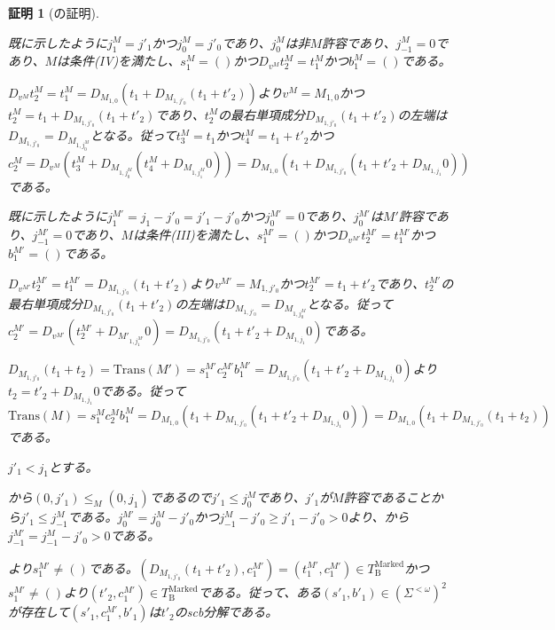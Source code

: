 \documentclass[dvipdfmx,uplatex]{jsarticle}
\theoremstyle{customnonumberbreakfortheorem}
\theoremstyle{customnonumberbreakforproof}
\newtheorem{hideableproof}{証明}
\begin{document}
\begin{hideableproof}[の証明]
\begin{indented}
\begin{indented}
			\begin{indented}
				\item 既に示したように\(j_1^M = j'_1\)かつ\(j_0^M = j'_0\)であり、\(j_0^M\)は非\(M\)許容であり、\(j_{-1}^M = 0\)であり、\(M\)は条件(IV)を満たし、\(s_1^M = ()\)かつ\(D_{v^M} t_2^M = t_1^M\)かつ\(b_1^M = ()\)である。
				\item \(D_{v^M} t_2^M = t_1^M = D_{M_{1,0}}(t_1 + D_{M_{1,j'_0}}(t_1 + t'_2))\)より\(v^M = M_{1,0}\)かつ\(t_2^M = t_1 + D_{M_{1,j'_0}}(t_1 + t'_2)\)であり、\(t_2^M\)の最右単項成分\(D_{M_{1,j'_0}}(t_1 + t'_2)\)の左端は\(D_{M_{1,j'_0}} = D_{M_{1,j_0^M}}\)となる。従って\(t_3^M = t_1\)かつ\(t_4^M = t_1 + t'_2\)かつ\(c_2^M = D_{v^M}(t_3^M + D_{M_{1,j_0^M}}(t_4^M + D_{M_{1,j_1^M}} 0)) = D_{M_{1,0}}(t_1 + D_{M_{1,j'_0}}(t_1 + t'_2 + D_{M_{1,j_1}} 0))\)である。
				\item 既に示したように\(j_1^{M'} = j_1-j'_0 = j'_1-j'_0\)かつ\(j_0^{M'} = 0\)であり、\(j_0^{M'}\)は\(M'\)許容であり、\(j_{-1}^{M'} = 0\)であり、\(M\)は条件(III)を満たし、\(s_1^{M'} = ()\)かつ\(D_{v^{M'}} t_2^{M'} = t_1^{M'}\)かつ\(b_1^{M'} = ()\)である。
				\item \(D_{v^{M'}} t_2^{M'} = t_1^{M'} = D_{M_{1,j'_0}}(t_1 + t'_2)\)より\(v^{M'} = M_{1,j'_0}\)かつ\(t_2^{M'} = t_1 + t'_2\)であり、\(t_2^{M'}\)の最右単項成分\(D_{M_{1,j'_0}}(t_1 + t'_2)\)の左端は\(D_{M_{1,j'_0}} = D_{M_{1,j_0^M}}\)となる。従って\(c_2^{M'} = D_{v^{M'}}(t_2^{M'} + D_{M'_{1,j_1^{M'}}} 0) = D_{M_{1,j'_0}}(t_1 + t'_2 + D_{M_{1,j_1}} 0)\)である。
				\item \(D_{M_{1,j'_0}}(t_1 + t_2) = \textrm{Trans}(M') = s_1^{M'} c_2^{M'} b_1^{M'} = D_{M_{1,j'_0}}(t_1 + t'_2 + D_{M_{1,j_1}} 0)\)より\(t_2 = t'_2 + D_{M_{1,j_1}} 0\)である。従って\(\textrm{Trans}(M) = s_1^M c_2^M b_1^M = D_{M_{1,0}}(t_1 + D_{M_{1,j'_0}}(t_1 + t'_2 + D_{M_{1,j_1}} 0)) = D_{M_{1,0}}(t_1 + D_{M_{1,j'_0}}(t_1 + t_2))\)である。
			\end{indented}
			\item
			\item \(j'_1 < j_1\)とする。
			\begin{indented}
				\item {}から\((0,j'_1) \leq_M (0,j_1)\)であるので\(j'_1 \leq j_0^M\)であり、\(j'_1\)が\(M\)許容であることから\(j'_1 \leq j_{-1}^M\)である。\(j_0^{M'} = j_0^M-j'_0\)かつ\(j_{-1}^M-j'_0 \geq j'_1-j'_0 > 0\)より、から\(j_{-1}^{M'} = j_{-1}^M-j'_0 > 0\)である。
				\item {}より\(s_1^{M'} \neq ()\)である。\((D_{M_{1,j'_0}}(t_1 + t'_2),c_1^{M'}) = (t_1^{M'},c_1^{M'}) \in T_{\textrm{B}}^{\textrm{Marked}}\)かつ\(s_1^{M'} \neq ()\)より\((t'_2,c_1^{M'}) \in T_{\textrm{B}}^{\textrm{Marked}}\)である。従って、ある\((s'_1,b'_1) \in (\Sigma^{< \omega})^2\)が存在して\((s'_1,c_1^{M'},b'_1)\)は\(t'_2\)のscb分解である。

\end{indented}
\end{indented}
\end{indented}
\end{hideableproof}
\end{document}

